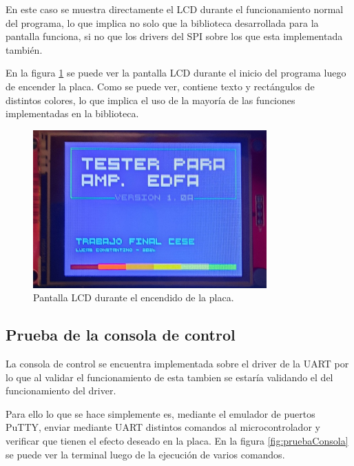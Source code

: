 En este caso se muestra directamente el LCD durante el funcionamiento normal del programa, lo que implica no solo que la biblioteca desarrollada para la pantalla funciona, si no que los drivers del SPI sobre los que esta implementada también.

En la figura \ref{fig:testLCD} se puede ver la pantalla LCD durante el inicio del programa luego de encender la placa. Como se puede ver, contiene texto y rectángulos de distintos colores, lo que implica el uso de la mayoría de las funciones implementadas en la biblioteca.

\begin{figure}[H]
\centering
\includegraphics[width=0.8\textwidth]{./Figures/testLCD.jpg}
\caption{Pantalla LCD durante el encendido de la placa.}
\label{fig:testLCD}
\end{figure}

\subsection{Prueba de la consola de control}

La consola de control se encuentra implementada sobre el driver de la UART por lo que al validar el funcionamiento de esta tambien se estaría validando el del funcionamiento del driver.

Para ello lo que se hace simplemente es, mediante el emulador de puertos PuTTY, enviar mediante UART distintos comandos al microcontrolador y verificar que tienen el efecto deseado en la placa. En la figura \ref{fig:pruebaConsola} se puede ver la terminal luego de la ejecución de varios comandos.


